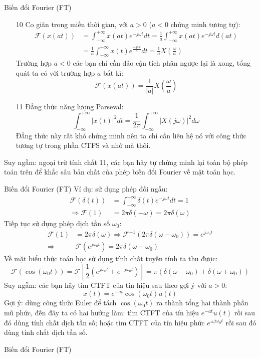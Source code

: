 \documentclass[8pt]{beamer}
\begin{document}
\begin{frame}{Biến đổi Fourier (FT)}
\begin{enumerate}
	\item[10] Co giãn trong miền thời gian, với $a>0$ ($a<0$ chứng minh tương tự):
\begin{equation*}
\begin{split}
	\mathscr{F}(x(at))&=\int_{-\infty}^{+\infty}x(at)e^{-j\omega t}dt=\frac{1}{a}\int_{-\infty}^{+\infty}x(at)e^{-j\omega t}d(at)\\
			  &=\frac{1}{a}\int_{-\infty}^{+\infty}x(t)e^{\frac{-j\omega t}{a}}dt=\frac{1}{a}X\left(\frac{\omega}{a}\right)
\end{split}
\end{equation*}
Trường hợp $a<0$ các bạn chỉ cần đảo cận tích phân ngược lại là xong, tổng quát ta có với trường hợp $a$ bất kì:
$$\mathscr{F}\left(x(at)\right)=\frac{1}{|a|}X\left(\frac{\omega}{a}\right)$$
\item[11] Đẳng thức năng lượng Parseval:
	$$\int_{-\infty}^{+\infty}|x(t)|^2 dt=\frac{1}{2\pi}\int_{-\infty}^{+\infty}|X(j\omega)|^2d\omega$$
	Đẳng thức này rất khó chứng minh nên ta chỉ cần liên hệ nó với công thức tương tự trong phần CTFS và nhớ mà thôi.
\end{enumerate}
Suy ngẫm: ngoại trừ tính chất 11, các bạn hãy tự chứng minh lại \alert{toàn bộ} phép toán trên để khắc sâu bản chất của phép biến đổi Fourier về mặt toán học.
\end{frame}
\begin{frame}{Biến đổi Fourier (FT)}
Ví dụ: sử dụng phép đối ngẫu:
\begin{equation*}
\begin{split}
	\mathscr{F}(\delta(t))&=\int_{-\infty}^{+\infty}\delta(t)e^{-j\omega t}dt=1 \\
	\Rightarrow \mathscr{F}(1)&=2\pi\delta(-\omega)=2\pi\delta(\omega)
\end{split}
\end{equation*}
Tiếp tục sử dụng phép dịch tần số $\omega_{0}$:
\begin{equation*}
	\begin{split}
		\mathscr{F}(1)&=2\pi\delta(\omega)\Rightarrow \mathscr{F}^{-1}(2\pi\delta(\omega-\omega_{0}))=e^{j\omega_{0}t}\\
		\Rightarrow & \mathscr{F}(e^{j\omega_{0}t})=2\pi\delta(\omega-\omega_{0})
	\end{split}
\end{equation*}
Về mặt \alert{biểu thức toán học} sử dụng tính chất tuyến tính ta thu được:
$$\mathscr{F}(\cos{(\omega_{0}t)})=\mathscr{F}\left[\frac{1}{2}\left(e^{j\omega_{0}t}+e^{-j\omega_{0}t}\right)\right]=\pi(\delta(\omega-\omega_{0})+\delta(\omega+\omega_{0}))$$
Suy ngẫm: các bạn hãy tìm CTFT của tín hiệu sau theo gợi ý với $a>0$:
$$x(t)=e^{-at}\cos{(\omega_{0}t)}u(t)$$
Gợi ý: dùng công thức Euler để tách $\cos(\omega_{0}t)$ ra thành tổng hai thành phần mũ phức, đến đây ta có hai hướng làm: tìm CTFT của tín hiệu $e^{-at}u(t)$ rồi sau đó dùng tính chất dịch tần số; hoặc tìm CTFT của tín hiệu phức $e^{\pm j\omega_{0}t}$ rồi sau đó dùng tính chất dịch tần số.
\end{frame}
\begin{frame}{Biến đổi Fourier (FT)}

\end{frame}
\end{document}
